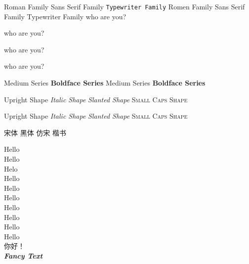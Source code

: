 \documentclass[10pt]{ctexart}
\newcommand{\myfont}{\textit{\textbf{\textsf{Fancy Text}}}}
\begin{document}
    \textrm{Roman Family}   \textsf{Sans Serif Family}   \texttt{Typewriter Family}
    {\rmfamily Romen Family}    {\sffamily Sans Serif Family}   {\ttfamily Typewriter Family}   %
    {\sffamily who are you?}
    
    {\ttfamily who are you?}
    
    who are you?
    
    who are you?

    \textmd{Medium Series} \textbf{Boldface Series}
    {\mdseries Medium Series} {\bfseries Boldface Series}

    \textup{Upright Shape} \textit{Italic Shape}
    \textsl{Slanted Shape} \textsc{Small Caps Shape}

    {\upshape Upright Shape} {\itshape Italic Shape}
    {\slshape Slanted Shape} {\scshape Small Caps Shape}

    {\songti 宋体} \quad    %
    {\heiti 黑体}  \quad
    {\fangsong 仿宋} \quad
    {\kaishu 楷书}

    {\tiny       Hello}\\%
    {\scriptsize Hello}\\
    {\footnotesize Helo}\\
    {\small Hello}\\
    {\normalsize Hello}\\
    {\large Hello}\\
    {\Large Hello}\\
    {\LARGE Hello}\\
    {\huge Hello}\\
    {\Huge Hello}\\

    你好！\\
    \myfont
    
\end{document}
